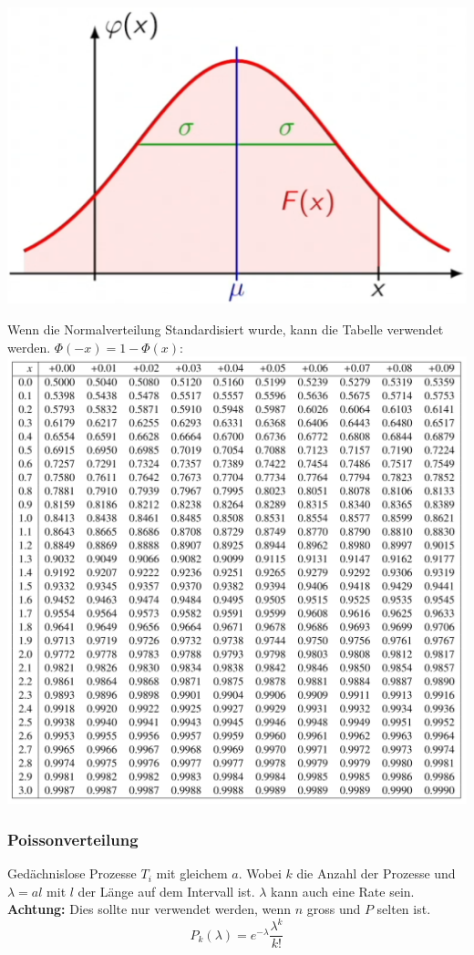 \begin{center}
	\includegraphics[width=0.6\columnwidth]{Images/normalverteilung}
\end{center}

\noindent Wenn die Normalverteilung Standardisiert wurde, kann die Tabelle verwendet werden. $\Phi(-x) = 1 - \Phi(x)$:\\
\includegraphics[width=\columnwidth]{Images/standard-normalverteilung}

\subsubsection{Poissonverteilung}
Gedächnislose Prozesse $T_i$ mit gleichem $a$. Wobei $k$ die Anzahl der Prozesse und $\lambda = al$ mit $l$ der Länge auf dem Intervall ist. $\lambda$ kann auch eine Rate sein. \textbf{Achtung:} Dies sollte nur verwendet werden, wenn $n$ gross und $P$ selten ist.
\[
P_k(\lambda) = e^{-\lambda}\frac{\lambda^k}{k!}
\]

